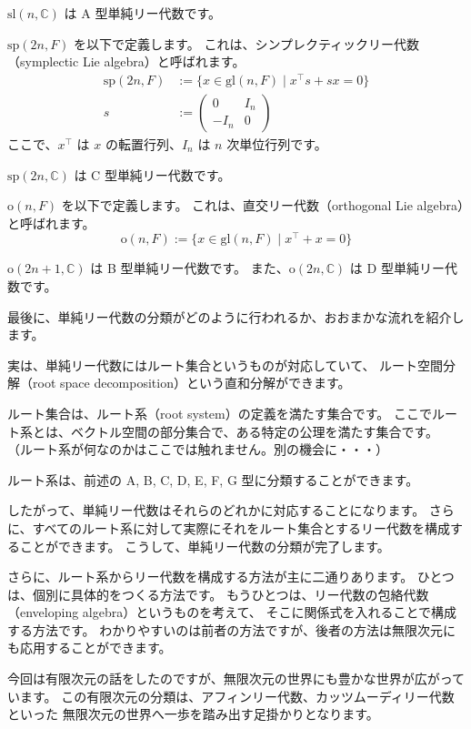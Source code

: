 \documentclass{ltjsarticle}
\begin{document}
\begin{example}[A型単純リー代数]
    \(\mathrm{sl}(n,\mathbb{C})\) は A 型単純リー代数です。
\end{example}

\begin{example}[C型単純リー代数]
    \(\mathrm{sp}(2n,F)\) を以下で定義します。
    これは、シンプレクティックリー代数（symplectic Lie algebra）と呼ばれます。
    \begin{align*}
        \mathrm{sp}(2n,F) & := \{x \in \mathrm{gl}(n,F) \mid x^{\intercal}s + sx = 0\} \\
        s                 & := \begin{pmatrix}
            0     & I_n \\
            - I_n & 0
        \end{pmatrix}
    \end{align*}
    ここで、\(x^{\intercal}\) は \(x\) の転置行列、\(I_n\) は \(n\) 次単位行列です。

    \(\mathrm{sp}(2n,\mathbb{C})\) は C 型単純リー代数です。
\end{example}

\begin{example}[B型およびD型単純リー代数]
    \(\mathrm{o}(n,F)\) を以下で定義します。
    これは、直交リー代数（orthogonal Lie algebra）と呼ばれます。
    \[
        \mathrm{o}(n,F) := \{x \in \mathrm{gl}(n,F) \mid  x^{\intercal} + x = 0\}
    \]

    \(\mathrm{o}(2n+1,\mathbb{C})\) は B 型単純リー代数です。
    また、\(\mathrm{o}(2n,\mathbb{C})\) は D 型単純リー代数です。
\end{example}

最後に、単純リー代数の分類がどのように行われるか、おおまかな流れを紹介します。

実は、単純リー代数にはルート集合というものが対応していて、
ルート空間分解（root space decomposition）という直和分解ができます。

ルート集合は、ルート系（root system）の定義を満たす集合です。
ここでルート系とは、ベクトル空間の部分集合で、ある特定の公理を満たす集合です。
（ルート系が何なのかはここでは触れません。別の機会に・・・）

ルート系は、前述の A, B, C, D, E, F, G 型に分類することができます。

したがって、単純リー代数はそれらのどれかに対応することになります。
さらに、すべてのルート系に対して実際にそれをルート集合とするリー代数を構成することができます。
こうして、単純リー代数の分類が完了します。

さらに、ルート系からリー代数を構成する方法が主に二通りあります。
ひとつは、個別に具体的をつくる方法です。
もうひとつは、リー代数の包絡代数（enveloping algebra）というものを考えて、
そこに関係式を入れることで構成する方法です。
わかりやすいのは前者の方法ですが、後者の方法は無限次元にも応用することができます。

今回は有限次元の話をしたのですが、無限次元の世界にも豊かな世界が広がっています。
この有限次元の分類は、アフィンリー代数、カッツムーディリー代数といった
無限次元の世界へ一歩を踏み出す足掛かりとなります。
\end{document}
